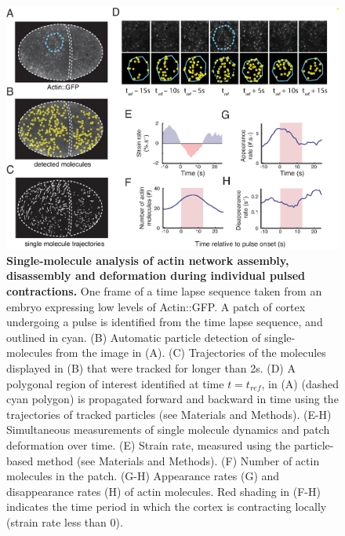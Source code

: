 \begin{figure}[!htbp]
\centering
\includegraphics[width=1\textwidth]{pulse/Figure2-2}

\caption[Single-molecule analysis of actin network assembly, disassembly and deformation during individual pulsed contractions.]{\label{fig:222}\textbf{Single-molecule analysis of actin network assembly, disassembly and deformation during individual pulsed contractions.} One frame of a time lapse sequence taken from an embryo expressing low levels of Actin::GFP. A patch of cortex undergoing a pulse is identified from the time lapse sequence, and outlined in cyan. (B) Automatic particle detection of single-molecules from the image in (A). (C) Trajectories of the molecules displayed in (B) that were tracked for longer than 2s. (D) A polygonal region of interest identified at time $t = t_{ref}$, in (A) (dashed cyan polygon) is propagated forward and backward in time using the trajectories of tracked particles (see Materials and Methods). (E-H) Simultaneous measurements of single molecule dynamics and patch deformation over time. (E) Strain rate, measured using the particle-based method (see Materials and Methods). (F) Number of actin molecules in the patch. (G-H) Appearance rates (G) and disappearance rates (H) of actin molecules. Red shading in (F-H) indicates the time period in which the cortex is contracting locally (strain rate less than  0).}
\end{figure}


